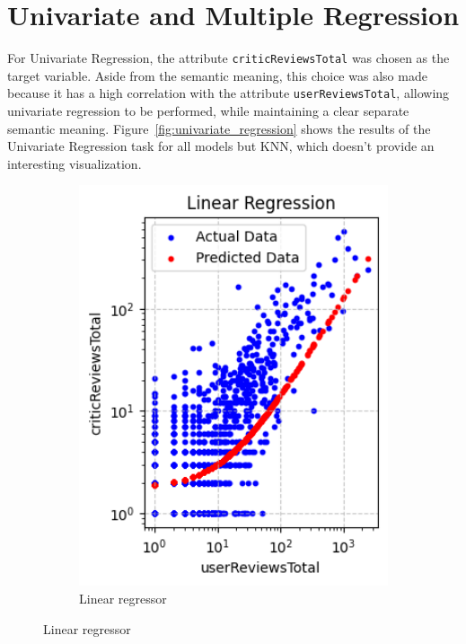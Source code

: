 \section{Univariate and Multiple Regression}
For Univariate Regression, the attribute
\texttt{criticReviewsTotal} was chosen
as the target variable. Aside from the semantic meaning, this choice was also made
because it has a high correlation
with the attribute \texttt{userReviewsTotal}, allowing univariate regression
to be performed, while maintaining a clear separate semantic meaning.
Figure~\ref{fig:univariate_regression} shows the results of the Univariate Regression task for
all models but KNN, which doesn't provide an interesting visualization.
\begin{figure}[H]
    \centering
    \begin{subfigure}{0.2565\textwidth}
        \centering
        \includegraphics[width=1\textwidth]{plots/linear.png}
        \caption{Linear regressor}
        \captionsetup{width=0.9\linewidth, justification=centering}

\end{subfigure}
\end{figure}

